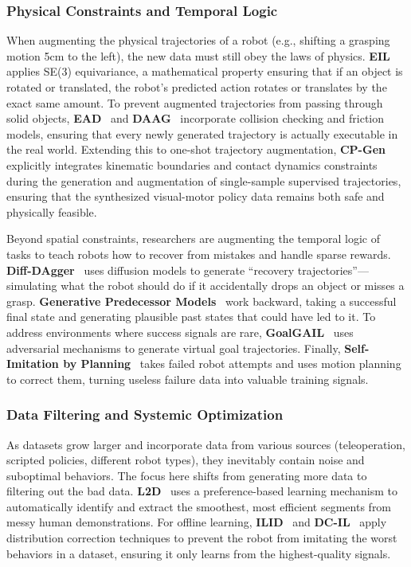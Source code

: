 \documentclass[acmsmall,screen,review,anonymous]{acmart}
\begin{document}
\subsubsection{Physical Constraints and Temporal Logic}\label{sec:dynamics_constraints}

When augmenting the physical trajectories of a robot (e.g., shifting a grasping motion 5cm to the left), the new data must still obey the laws of physics. \textbf{EIL}~\cite{we2024equivariant} applies SE(3) equivariance, a mathematical property ensuring that if an object is rotated or translated, the robot's predicted action rotates or translates by the exact same amount. To prevent augmented trajectories from passing through solid objects, \textbf{EAD}~\cite{geng2024environment} and \textbf{DAAG}~\cite{jia2024dynamics} incorporate collision checking and friction models, ensuring that every newly generated trajectory is actually executable in the real world. Extending this to one-shot trajectory augmentation, \textbf{CP-Gen}~\cite{lin2025cpgen} explicitly integrates kinematic boundaries and contact dynamics constraints during the generation and augmentation of single-sample supervised trajectories, ensuring that the synthesized visual-motor policy data remains both safe and physically feasible.

Beyond spatial constraints, researchers are augmenting the temporal logic of tasks to teach robots how to recover from mistakes and handle sparse rewards. \textbf{Diff-DAgger}~\cite{lo2024diffdagger} uses diffusion models to generate ``recovery trajectories''—simulating what the robot should do if it accidentally drops an object or misses a grasp. \textbf{Generative Predecessor Models}~\cite{yang2024generative} work backward, taking a successful final state and generating plausible past states that could have led to it. To address environments where success signals are rare, \textbf{GoalGAIL}~\cite{ding2024goalgail} uses adversarial mechanisms to generate virtual goal trajectories. Finally, \textbf{Self-Imitation by Planning}~\cite{sun2024self} takes failed robot attempts and uses motion planning to correct them, turning useless failure data into valuable training signals.

\subsubsection{Data Filtering and Systemic Optimization}\label{sec:data_refinement}

As datasets grow larger and incorporate data from various sources (teleoperation, scripted policies, different robot types), they inevitably contain noise and suboptimal behaviors. The focus here shifts from generating more data to filtering out the bad data. \textbf{L2D}~\cite{yue2024learning} uses a preference-based learning mechanism to automatically identify and extract the smoothest, most efficient segments from messy human demonstrations. For offline learning, \textbf{ILID}~\cite{belkhale2023data} and \textbf{DC-IL}~\cite{kim2024distribution} apply distribution correction techniques to prevent the robot from imitating the worst behaviors in a dataset, ensuring it only learns from the highest-quality signals.
\end{document}
